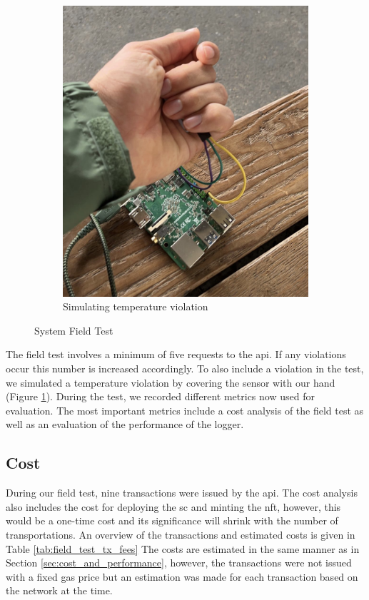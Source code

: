 \begin{figure}[ht]
\begin{subfigure}{0.5\textwidth}
        \includegraphics[height=0.25\textheight]{resources/cover_sensor.jpeg}
        \caption{Simulating temperature violation}
        \label{fig:covering_sensor}
    \end{subfigure}
    \caption{System Field Test}
    \label{fig:field_test}
\end{figure}

The field test involves a minimum of five requests to the \gls{api}. If any violations occur this number is increased accordingly. To also include a violation in the test, we simulated a temperature violation by covering the sensor with our hand (Figure \ref{fig:covering_sensor}). During the test, we recorded different metrics now used for evaluation. The most important metrics include a cost analysis of the field test as well as an evaluation of the performance of the logger.

\subsection{Cost}
During our field test, nine transactions were issued by the \gls{api}. The cost analysis also includes the cost for deploying the \gls{sc} and minting the \gls{nft}, however, this would be a one-time cost and its significance will shrink with the number of transportations. An overview of the transactions and estimated costs is given in Table \ref{tab:field_test_tx_fees} The costs are estimated in the same manner as in Section \ref{sec:cost_and_performance}, however, the transactions were not issued with a fixed gas price but an estimation was made for each transaction based on the network at the time. 

